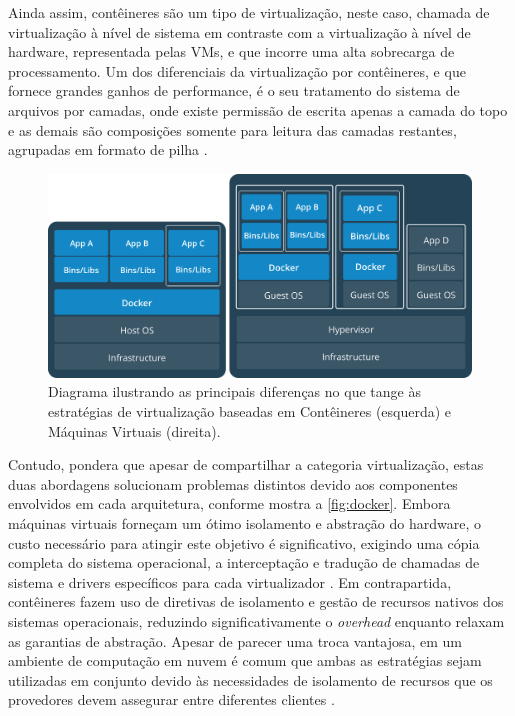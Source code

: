 \documentclass[english,brazilian]{UNISINOSmonografia} %
\newcommand\defaultFigureWidth{0.9}
\begin{document}
Ainda assim, contêineres são um tipo de virtualização, neste caso, chamada de virtualização à nível de sistema \cite{Tosatto2015} em contraste com a virtualização à nível de hardware, representada pelas VMs, e que incorre uma alta sobrecarga de processamento.
Um dos diferenciais da virtualização por contêineres, e que fornece grandes ganhos de performance, é o seu tratamento do sistema de arquivos por camadas, onde existe permissão de escrita apenas a camada do topo e as demais são composições somente para leitura das camadas restantes, agrupadas em formato de pilha \cite{Higgins2015}.


\begin{figure}[tb]
	\centering%
	\begin{minipage}{\defaultFigureWidth\textwidth}
		\caption[Diagrama ilustrando as principais diferenças no que tange às estratégias de virtualização baseadas em Contêineres e Máquinas Virtuais.]{Diagrama ilustrando as principais diferenças no que tange às estratégias de virtualização baseadas em Contêineres (esquerda) e Máquinas Virtuais (direita).}
		\label{fig:docker}
		\vspace{1ex}
		\includegraphics[clip,width=\textwidth]{docker-concept}
	\end{minipage}
\end{figure}



Contudo,  pondera que apesar de compartilhar a categoria virtualização, estas duas abordagens solucionam problemas distintos devido aos componentes envolvidos em cada arquitetura, conforme mostra a \autoref{fig:docker}.
Embora máquinas virtuais forneçam um ótimo isolamento e abstração do hardware, o custo necessário para atingir este objetivo é significativo, exigindo uma cópia completa do sistema operacional, a interceptação e tradução de chamadas de sistema e drivers específicos para cada virtualizador \cite{Felter2015}.
Em contrapartida, contêineres fazem uso de diretivas de isolamento e gestão de recursos nativos dos sistemas operacionais, reduzindo significativamente o \textit{overhead} enquanto relaxam as garantias de abstração.
Apesar de parecer uma troca vantajosa, em um ambiente de computação em nuvem é comum que ambas as estratégias sejam utilizadas em conjunto devido às necessidades de isolamento de recursos que os provedores devem assegurar entre diferentes clientes \cite{Bernstein2014}.
\end{document}
